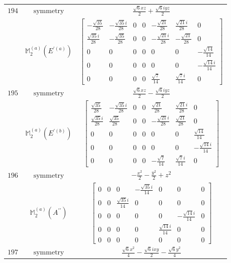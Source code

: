 \documentclass[fleqn,8pt,landscape]{jsarticle}
\begin{document}
\begin{longtable}{ccc}
$ 194 $ & $ \text{symmetry} $ & $ \frac{\sqrt{6} x z}{2} + \frac{\sqrt{6} i y z}{2} $ \\
$  $ & $ \mathbb{M}_{2}^{(a)}(E^{\prime(a)}) $ & $ \begin{bmatrix} - \frac{\sqrt{35}}{28} & - \frac{\sqrt{35} i}{28} & 0 & 0 & - \frac{\sqrt{21}}{28} & \frac{\sqrt{21} i}{28} & 0 \\ \frac{\sqrt{35} i}{28} & - \frac{\sqrt{35}}{28} & 0 & 0 & - \frac{\sqrt{21} i}{28} & - \frac{\sqrt{21}}{28} & 0 \\ 0 & 0 & 0 & 0 & 0 & 0 & - \frac{\sqrt{14}}{14} \\ 0 & 0 & 0 & 0 & 0 & 0 & - \frac{\sqrt{14} i}{14} \\ 0 & 0 & 0 & 0 & \frac{\sqrt{7}}{14} & \frac{\sqrt{7} i}{14} & 0 \end{bmatrix} $ \\ \hline
$ 195 $ & $ \text{symmetry} $ & $ \frac{\sqrt{6} x z}{2} - \frac{\sqrt{6} i y z}{2} $ \\
$  $ & $ \mathbb{M}_{2}^{(a)}(E^{\prime(b)}) $ & $ \begin{bmatrix} \frac{\sqrt{35}}{28} & - \frac{\sqrt{35} i}{28} & 0 & 0 & \frac{\sqrt{21}}{28} & \frac{\sqrt{21} i}{28} & 0 \\ \frac{\sqrt{35} i}{28} & \frac{\sqrt{35}}{28} & 0 & 0 & - \frac{\sqrt{21} i}{28} & \frac{\sqrt{21}}{28} & 0 \\ 0 & 0 & 0 & 0 & 0 & 0 & \frac{\sqrt{14}}{14} \\ 0 & 0 & 0 & 0 & 0 & 0 & - \frac{\sqrt{14} i}{14} \\ 0 & 0 & 0 & 0 & - \frac{\sqrt{7}}{14} & \frac{\sqrt{7} i}{14} & 0 \end{bmatrix} $ \\ \hline
$ 196 $ & $ \text{symmetry} $ & $ - \frac{x^{2}}{2} - \frac{y^{2}}{2} + z^{2} $ \\
$  $ & $ \mathbb{M}_{2}^{(a)}(A^{\prime\prime}) $ & $ \begin{bmatrix} 0 & 0 & 0 & - \frac{\sqrt{35} i}{14} & 0 & 0 & 0 \\ 0 & 0 & \frac{\sqrt{35} i}{14} & 0 & 0 & 0 & 0 \\ 0 & 0 & 0 & 0 & 0 & - \frac{\sqrt{14} i}{14} & 0 \\ 0 & 0 & 0 & 0 & \frac{\sqrt{14} i}{14} & 0 & 0 \\ 0 & 0 & 0 & 0 & 0 & 0 & 0 \end{bmatrix} $ \\ \hline
$ 197 $ & $ \text{symmetry} $ & $ \frac{\sqrt{6} x^{2}}{4} - \frac{\sqrt{6} i x y}{2} - \frac{\sqrt{6} y^{2}}{4} $ \\

\end{longtable}
\end{document}
